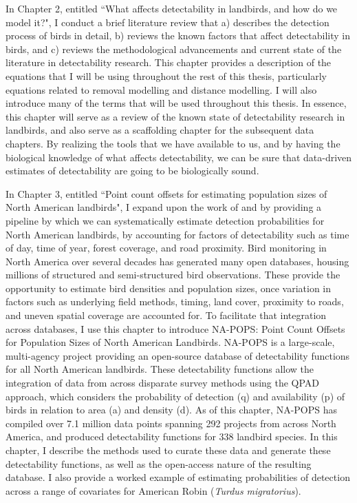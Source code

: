 \par In Chapter 2, entitled ``What affects detectability in landbirds, and how do we model it?", I conduct a brief literature review that a) describes the detection process of birds in detail, b) reviews the known factors that affect detectability in birds, and c) reviews the methodological advancements and current state of the literature in detectability research.
This chapter provides a description of the equations that I will be using throughout the rest of this thesis, particularly equations related to removal modelling and distance modelling.
I will also introduce many of the terms that will be used throughout this thesis.
In essence, this chapter will serve as a review of the known state of detectability research in landbirds, and also serve as a scaffolding chapter for the subsequent data chapters.
By realizing the tools that we have available to us, and by having the biological knowledge of what affects detectability, we can be sure that data-driven estimates of detectability are going to be biologically sound.


\par In Chapter 3, entitled ``Point count offsets for estimating population sizes of North American landbirds", I expand upon the work of \citet{solymos_calibrating_2013} and \citet{solymos_evaluating_2018} by providing a pipeline by which we can systematically estimate detection probabilities for North American landbirds, by accounting for factors of detectability such as time of day, time of year, forest coverage, and road proximity.
Bird monitoring in North America over several decades has generated many open databases, housing millions of structured and semi-structured bird observations. 
These provide the opportunity to estimate bird densities and population sizes, once variation in factors such as underlying field methods, timing, land cover, proximity to roads, and uneven spatial coverage are accounted for. 
To facilitate that integration across databases, I use this chapter to introduce NA-POPS: Point Count Offsets for Population Sizes of North American Landbirds. 
NA-POPS is a large-scale, multi-agency project providing an open-source database of detectability functions for all North American landbirds. 
These detectability functions allow the integration of data from across disparate survey methods using the QPAD approach, which considers the probability of detection (q) and availability (p) of birds in relation to area (a) and density (d). 
As of this chapter, NA-POPS has compiled over 7.1 million data points spanning 292 projects from across North America, and produced detectability functions for 338 landbird species. 
In this chapter, I describe the methods used to curate these data and generate these detectability functions, as well as the open-access nature of the resulting database. 
I also provide a worked example of estimating probabilities of detection across a range of covariates for American Robin (\textit{Turdus migratorius}).


